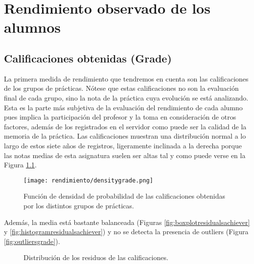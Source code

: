 \chapter{Rendimiento observado de los alumnos}\label{chapter:rendimiento}

\section{Calificaciones obtenidas (Grade)}

La primera medida de rendimiento que tendremos en cuenta son las calificaciones de los grupos de prácticas. Nótese que estas calificaciones no son la evaluación final de cada grupo, sino la nota de la práctica cuya evolución se está analizando. Esta es la parte más subjetiva de la evaluación del rendimiento de cada alumno pues implica la participación del profesor y la toma en consideración de otros factores, además de los registrados en el servidor como puede ser la calidad de la memoria de la práctica. Las calificaciones muestran una distribución normal a lo largo de estos siete años de registros, ligeramente inclinada a la derecha porque las notas medias de esta asignatura suelen ser altas tal y como puede verse en la Figura \ref{fig:densityplotachiever}.

\begin{figure}[H]
    \centering
    \texttt{[image: rendimiento/densitygrade.png]}
    \caption{Función de densidad de probabilidad de las calificaciones obtenidas por los distintos grupos de prácticas.}
    \label{fig:densityplotachiever}
\end{figure}

Además, la media está bastante balanceada (Figuras \ref{fig:boxplotresidualsachiever} y \ref{fig:histogramresidualsachiever}) y no se detecta la presencia de outliers (Figura \ref{fig:outliersgrade}).

\begin{figure}[H]
\centering
{}\qquad
{}
\caption{Distribución de los residuos de las calificaciones.}
\label{fig:achiever}
\end{figure}

